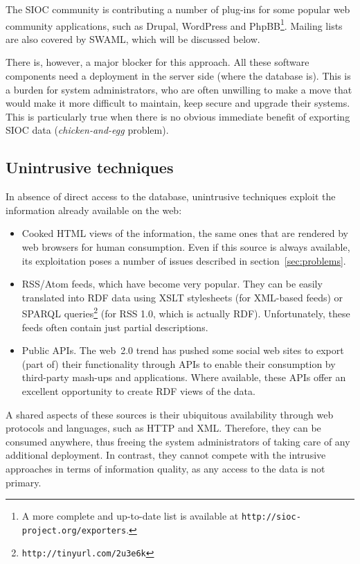 \documentclass{../templates/www2008-submission}
\begin{document}
The SIOC community is contributing a number of plug-ins for some
popular web community applications, such as Drupal, WordPress and 
PhpBB\footnote{A more complete and up-to-date list is available
at \texttt{http://sioc-project.org/exporters}.}. Mailing lists are
also covered by SWAML, which will be discussed below.

There is, however, a major blocker for this approach. All these
software components need a deployment in the server side (where
the database is). This is a burden for system administrators, who
are often unwilling to make a move that would make it more difficult to
maintain, keep secure and upgrade their systems. This is particularly
true when there is no obvious immediate benefit of exporting
SIOC data (\emph{chicken-and-egg} problem).

\subsection{Unintrusive techniques}

In absence of direct access to the database, unintrusive
techniques exploit the information already available on the web:

\begin{itemize}

\item Cooked HTML views of the information, the same ones that
are rendered by web browsers for human consumption. Even if this 
source is always available, its exploitation poses a number of 
issues described in section~\ref{sec:problems}.

\item RSS/Atom feeds, which have become very popular. They can be easily
translated into RDF data using XSLT stylesheets (for XML-based feeds) or 
SPARQL queries\footnote{\texttt{http://tinyurl.com/2u3e6k}} (for RSS 1.0, 
which is actually RDF). Unfortunately, these feeds often contain just 
partial descriptions.

\item Public APIs. The web~2.0 trend has pushed some social web
sites to export (part of) their functionality through APIs
to enable their consumption by third-party mash-ups and applications.
Where available, these APIs offer an excellent opportunity to
create RDF views of the data.

\end{itemize}

A shared aspects of these sources is their ubiquitous availability through
web protocols and languages, such as HTTP and XML. Therefore, they
can be consumed anywhere, thus freeing the system administrators of
taking care of any additional deployment. In contrast, they cannot compete
with the intrusive approaches in terms of information quality, as
any access to the data is not primary.
\end{document}
